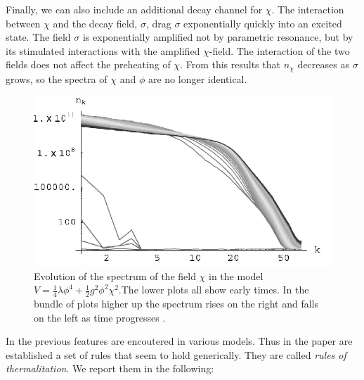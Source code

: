 \documentclass[11pt,a4paper,twoside]{book}
\begin{document}
Finally, we can also include an additional decay channel for $\chi$. The interaction between $\chi$ and the decay field, $\sigma$, drag $\sigma$ exponentially quickly into an excited state. The field $\sigma$ is exponentially amplified not by parametric resonance, but by its stimulated interactions with the amplified $\chi$-field. The interaction of the two fields does not affect the preheating of $\chi$. From this results that $ n_{\chi} $ decreases as $\sigma$ grows, so the spectra of $\chi$ and $\phi$ are no longer identical.\\
\begin{figure}
	\centering
	\includegraphics[width=0.6\linewidth, height=0.25\textheight]{Images/Chap6/DevelopmentOfEquilibrium_fig2}
	\caption{Evolution of the spectrum of the field $\chi$ in the model $ V=\frac{1}{4}\lambda \phi^{4} + \frac{1}{2}g^{2}\phi^{2}\chi^{2}. $The lower plots all show early times. In the bundle of plots higher up the spectrum rises on the right and falls on the left as time progresses  \cite{Chap6:DevelopmentEquilibrium}. }
	\label{fig:developmentofequilibriumfig2}
\end{figure}
In \cite{Chap6:DevelopmentEquilibrium} the previous features are encoutered in various models.  Thus in the paper are established a set of rules that seem to hold generically. They are called \textit{rules of thermalitation}. We report them in the following:
\end{document}

